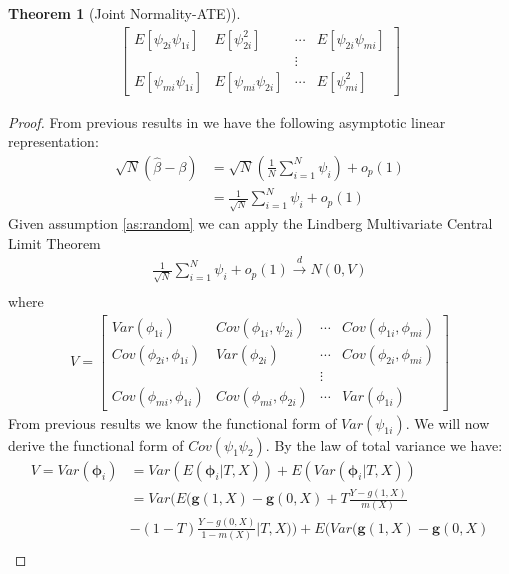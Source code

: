 \documentclass[12pt]{article}
\newtheorem{theorem}{Theorem}
\begin{document}
\begin{outline}[enumerate]
\begin{theorem}[Joint Normality-ATE)]
\begin{align*}
\begin{bmatrix}
								E[\psi_{2i}\psi_{1i}] & E[\psi_{2i}^2] 	  & \cdots & E[\psi_{2i}\psi_{mi}] \\
												&			  	  &	\vdots & \\
								E[\psi_{mi}\psi_{1i}] & E[\psi_{mi}\psi_{2i}] & \cdots & E[\psi_{mi}^2]
							\end{bmatrix}
						\end{align*}
					\end{theorem}
					\begin{proof}
						From previous results in \cite{chernozhukov2018double} we have the following asymptotic linear representation:
						\begin{align*}
							\sqrt{N}(\hat{\beta}-\beta) &= \sqrt{N}(\frac{1}{N}\sum_{i=1}^{N}\psi_i) + o_p(1)\\
							&= \frac{1}{\sqrt{N}}\sum_{i=1}^{N}\psi_i + o_p(1)
						\end{align*}
						Given assumption \ref{as:random} we can apply the Lindberg Multivariate Central Limit Theorem
						\begin{align*}
							\frac{1}{\sqrt{N}}\sum_{i=1}^{N}\psi_i + o_p(1)\xrightarrow[]{d} N(0,V)\\
						\end{align*}
						where 
						\begin{align*}
							V = 
							\begin{bmatrix}
							Var(\phi_{1i}) 	& Cov(\phi_{1i},\psi_{2i}) & \cdots & Cov(\phi_{1i},\phi_{mi}) \\
							Cov(\phi_{2i},\phi_{1i}) & Var(\phi_{2i})	  & \cdots & Cov(\phi_{2i},\phi_{mi}) \\
							&			  	  &	\vdots & \\
							Cov(\phi_{mi},\phi_{1i}) & Cov(\phi_{mi},\phi_{2i}) & \cdots & Var(\phi_{1i})
							\end{bmatrix}
						\end{align*}
						From previous results we know the functional form of $Var(\psi_{1i})$. We will now derive the functional form of $Cov(\psi_{1}\psi_{2})$. By the law of total variance we have:
						\begin{align*}
							V = Var(\pmb{\phi}_i) &= Var(E(\pmb{\phi}_i|T,X)) + E(Var(\pmb{\phi}_i|T,X))\\
							&= Var\Big(E\big(\mathbf{g}(1,X)-\mathbf{g}(0,X) + T\frac{Y-g(1,X)}{m(X)} \\
							&- (1-T)\frac{Y-g(0,X)}{1-m(X)}|T,X\big)\Big) 
							+ E\Big(Var\big(\mathbf{g}(1,X)-\mathbf{g}(0,X) \\

\end{align*}
\end{proof}
\end{outline}
\end{document}
